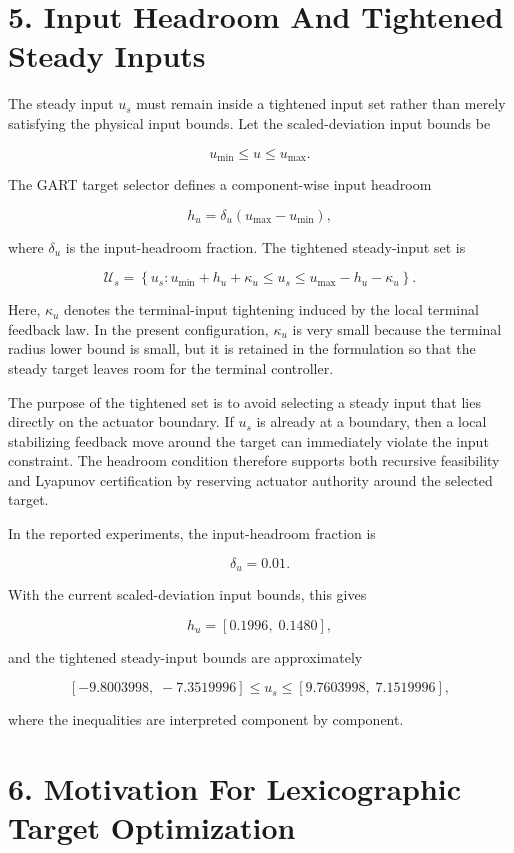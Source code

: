 \documentclass[11pt]{article}
\begin{document}
\section*{5. Input Headroom And Tightened Steady Inputs}

The steady input $u_s$ must remain inside a tightened input set rather than merely satisfying the physical input bounds. Let the scaled-deviation input bounds be


\[
u_{\min}\le u\le u_{\max}.
\]

The GART target selector defines a component-wise input headroom


\[
h_u
=
\delta_u (u_{\max}-u_{\min}),
\]

where $\delta_u$ is the input-headroom fraction. The tightened steady-input set is


\[
\mathcal U_s
=
\left\{
u_s:
u_{\min}+h_u+\kappa_u
\le
u_s
\le
u_{\max}-h_u-\kappa_u
\right\}.
\]

Here, $\kappa_u$ denotes the terminal-input tightening induced by the local terminal feedback law. In the present configuration, $\kappa_u$ is very small because the terminal radius lower bound is small, but it is retained in the formulation so that the steady target leaves room for the terminal controller.


The purpose of the tightened set is to avoid selecting a steady input that lies directly on the actuator boundary. If $u_s$ is already at a boundary, then a local stabilizing feedback move around the target can immediately violate the input constraint. The headroom condition therefore supports both recursive feasibility and Lyapunov certification by reserving actuator authority around the selected target.


In the reported experiments, the input-headroom fraction is


\[
\delta_u=0.01.
\]

With the current scaled-deviation input bounds, this gives


\[
h_u=[0.1996,\;0.1480],
\]

and the tightened steady-input bounds are approximately


\[
[-9.8003998,\;-7.3519996]
\le
u_s
\le
[9.7603998,\;7.1519996],
\]

where the inequalities are interpreted component by component.


\section*{6. Motivation For Lexicographic Target Optimization}
\end{document}

